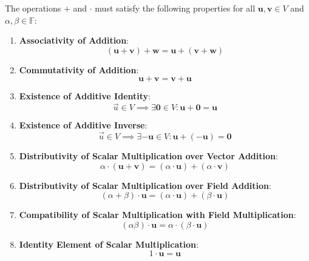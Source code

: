 \begin{note}
The operations $+$ and $\cdot$ must satisfy the following properties for all $\mathbf{u}, \mathbf{v} \in V$ and $\alpha, \beta \in \mathbb{F}$:
\begin{enumerate}
	\item \textbf{Associativity of Addition}:
	\begin{equation*}
		(\mathbf{u} + \mathbf{v}) + \mathbf{w} = \mathbf{u} + (\mathbf{v} + \mathbf{w})
	\end{equation*}
	\item \textbf{Commutativity of Addition}:
	\begin{equation*}
		\mathbf{u} + \mathbf{v} = \mathbf{v} + \mathbf{u}
	\end{equation*}
	\item \textbf{Existence of Additive Identity}:
	\begin{equation*}
		\vec{u}\in V\implies\exists \mathbf{0} \in V:\mathbf{u} + \mathbf{0} = \mathbf{u}
	\end{equation*}
	\item \textbf{Existence of Additive Inverse}:
	\begin{equation*}
		\vec{u}\in V\implies \exists -\mathbf{u} \in V : \mathbf{u} + (-\mathbf{u}) = \mathbf{0}
	\end{equation*}
	\item \textbf{Distributivity of Scalar Multiplication over Vector Addition}:
	\begin{equation*}
		\alpha \cdot (\mathbf{u} + \mathbf{v}) = (\alpha \cdot \mathbf{u}) + (\alpha \cdot \mathbf{v})
	\end{equation*}
	\item \textbf{Distributivity of Scalar Multiplication over Field Addition}:
	\begin{equation*}
		(\alpha + \beta) \cdot \mathbf{u} = (\alpha \cdot \mathbf{u}) + (\beta \cdot \mathbf{u})
	\end{equation*}
	\item \textbf{Compatibility of Scalar Multiplication with Field Multiplication}:
	\begin{equation*}
		(\alpha \beta) \cdot \mathbf{u} = \alpha \cdot (\beta \cdot \mathbf{u})
	\end{equation*}
	\item \textbf{Identity Element of Scalar Multiplication}:
	\begin{equation*}
		1 \cdot \mathbf{u} = \mathbf{u}
	\end{equation*}
\end{enumerate}
\end{note}

